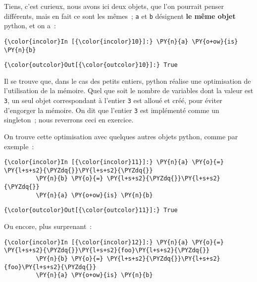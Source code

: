     Tiens, c'est curieux, nous avons ici deux objets, que l'on pourrait
penser différents, mais en fait ce sont les mêmes~; \texttt{a} et
\texttt{b} désignent \textbf{le même objet} python, et on a~:

    \begin{Verbatim}[commandchars=\\\{\}]
{\color{incolor}In [{\color{incolor}10}]:} \PY{n}{a} \PY{o+ow}{is} \PY{n}{b}
\end{Verbatim}


\begin{Verbatim}[commandchars=\\\{\}]
{\color{outcolor}Out[{\color{outcolor}10}]:} True
\end{Verbatim}
            
    Il se trouve que, dans le cas des petits entiers, python réalise une
optimisation de l'utilisation de la mémoire. Quel que soit le nombre de
variables dont la valeur est \texttt{3}, un seul objet correspondant à
l'entier \texttt{3} est alloué et créé, pour éviter d'engorger la
mémoire. On dit que l'entier \texttt{3} est implémenté comme un
singleton~; nous reverrons ceci en exercice.

    On trouve cette optimisation avec quelques autres objets python, comme
par exemple~:

    \begin{Verbatim}[commandchars=\\\{\}]
{\color{incolor}In [{\color{incolor}11}]:} \PY{n}{a} \PY{o}{=} \PY{l+s+s2}{\PYZdq{}}\PY{l+s+s2}{\PYZdq{}}
         \PY{n}{b} \PY{o}{=} \PY{l+s+s2}{\PYZdq{}}\PY{l+s+s2}{\PYZdq{}}
         \PY{n}{a} \PY{o+ow}{is} \PY{n}{b}
\end{Verbatim}


\begin{Verbatim}[commandchars=\\\{\}]
{\color{outcolor}Out[{\color{outcolor}11}]:} True
\end{Verbatim}
            
    Ou encore, plus surprenant~:

    \begin{Verbatim}[commandchars=\\\{\}]
{\color{incolor}In [{\color{incolor}12}]:} \PY{n}{a} \PY{o}{=} \PY{l+s+s2}{\PYZdq{}}\PY{l+s+s2}{foo}\PY{l+s+s2}{\PYZdq{}}
         \PY{n}{b} \PY{o}{=} \PY{l+s+s2}{\PYZdq{}}\PY{l+s+s2}{foo}\PY{l+s+s2}{\PYZdq{}}
         \PY{n}{a} \PY{o+ow}{is} \PY{n}{b}
\end{Verbatim}


